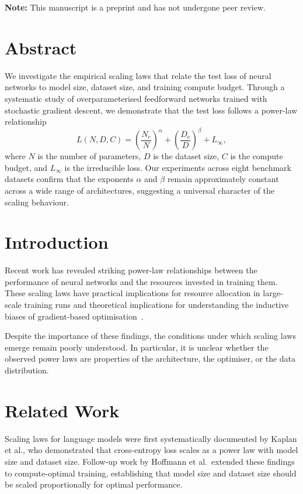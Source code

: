 \documentclass[
    language=english,
    doctype=article,
    institution=none,
    titlestyle=book,
]{../../omnilatex}
\begin{document}
\maketitle

\begin{center}
    \textbf{Note:} This manuscript is a preprint and has not undergone peer
    review.
\end{center}

\section*{Abstract}
We investigate the empirical scaling laws that relate the test loss of
neural networks to model size, dataset size, and training compute budget.
Through a systematic study of overparameterised feedforward networks trained
with stochastic gradient descent, we demonstrate that the test loss follows a
power-law relationship
\begin{equation}
    L(N, D, C) = \left(\frac{N_c}{N}\right)^{\alpha}
                  + \left(\frac{D_c}{D}\right)^{\beta}
                  + L_{\infty},
    \label{eq:scaling}
\end{equation}
where $N$ is the number of parameters, $D$ is the dataset size, $C$ is the
compute budget, and $L_{\infty}$ is the irreducible loss.  Our experiments
across eight benchmark datasets confirm that the exponents $\alpha$ and
$\beta$ remain approximately constant across a wide range of architectures,
suggesting a universal character of the scaling behaviour.

\section{Introduction}
Recent work has revealed striking power-law relationships between the
performance of neural networks and the resources invested in training them.
These scaling laws have practical implications for resource allocation in
large-scale training runs and theoretical implications for understanding the
inductive biases of gradient-based optimisation~\cite{bibid}.

Despite the importance of these findings, the conditions under which scaling
laws emerge remain poorly understood.  In particular, it is unclear whether
the observed power laws are properties of the architecture, the optimiser, or
the data distribution.

\section{Related Work}
Scaling laws for language models were first systematically documented by
Kaplan et al., who demonstrated that cross-entropy loss scales as a power law
with model size and dataset size.  Follow-up work by Hoffmann et al.~extended
these findings to compute-optimal training, establishing that model size and
dataset size should be scaled proportionally for optimal performance.
\end{document}
